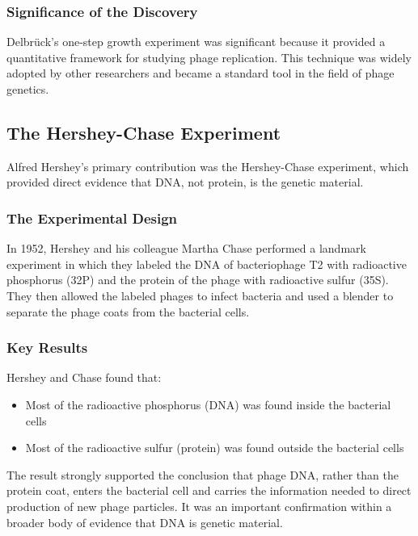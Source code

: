 \subsubsection{Significance of the Discovery}

Delbr\"uck's one-step growth experiment was significant because it provided a quantitative framework for studying phage replication. This technique was widely adopted by other researchers and became a standard tool in the field of phage genetics.

\subsection{The Hershey-Chase Experiment}

Alfred Hershey's primary contribution was the Hershey-Chase experiment, which provided direct evidence that DNA, not protein, is the genetic material.

\subsubsection{The Experimental Design}

In 1952, Hershey and his colleague Martha Chase performed a landmark experiment in which they labeled the DNA of bacteriophage T2 with radioactive phosphorus (32P) and the protein of the phage with radioactive sulfur (35S). They then allowed the labeled phages to infect bacteria and used a blender to separate the phage coats from the bacterial cells.

\subsubsection{Key Results}

Hershey and Chase found that:

\begin{itemize}
\item Most of the radioactive phosphorus (DNA) was found inside the bacterial cells
\item Most of the radioactive sulfur (protein) was found outside the bacterial cells
\end{itemize}

The result strongly supported the conclusion that phage DNA, rather than the protein coat, enters the bacterial cell and carries the information needed to direct production of new phage particles. It was an important confirmation within a broader body of evidence that DNA is genetic material.

